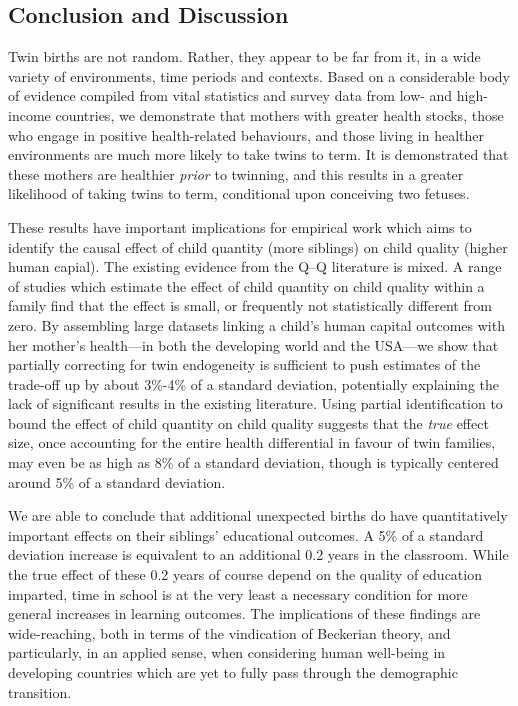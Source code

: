 \documentclass[subeqn]{article}
\begin{document}
\begin{spacing}{1.4}
\section*{Conclusion and Discussion}                   \label{TWINscn:conclusion}
Twin births are not random.  Rather, they appear to be far from it, in a wide
variety of environments, time periods and contexts.  Based on a considerable 
body of evidence compiled from vital statistics and survey data from low- and 
high-income countries, we demonstrate that mothers with greater health stocks,
those who engage in positive health-related behaviours, and those living in 
healther environments are much more likely to take twins to term.  It is 
demonstrated that these mothers are healthier \emph{prior} to twinning, and
this results in a greater likelihood of taking twins to term, conditional upon
conceiving two fetuses.

These results have important implications for empirical work which aims to 
identify the causal effect of child quantity (more siblings) on child quality
(higher human capial).  The existing evidence from the Q--Q literature is 
mixed.  A range of studies which estimate the effect of child quantity on child 
quality within a family find that the effect is small, or frequently not 
statistically different from zero.  By assembling large datasets linking a 
child's human capital outcomes with her mother's health---in both the developing 
world and the USA---we show that partially correcting for twin endogeneity is 
sufficient to push estimates of the trade-off up by about 3\%-4\% of a standard 
deviation, potentially explaining the lack of significant results in the 
existing literature.  Using partial identification to bound the effect of child 
quantity on child quality suggests that the \emph{true} effect size, once 
accounting for the entire health differential in favour of twin families, may 
even be as high as 8\% of a standard deviation, though is typically centered
around 5\% of a standard deviation.

We are able to conclude that additional unexpected births do have
quantitatively important effects on their siblings' educational outcomes.  
A 5\% of a standard deviation increase is equivalent to an additional 0.2
years in the classroom.  While the true effect of these 0.2 years of course
depend on the quality of education imparted, time in school is at the very 
least a necessary condition for more general increases in learning outcomes.  
The implications of these findings are wide-reaching, both in terms of the 
vindication of Beckerian theory, and particularly, in an applied sense, when 
considering human well-being in developing countries which are yet to fully 
pass through the demographic transition.


\end{spacing}
\end{document}

